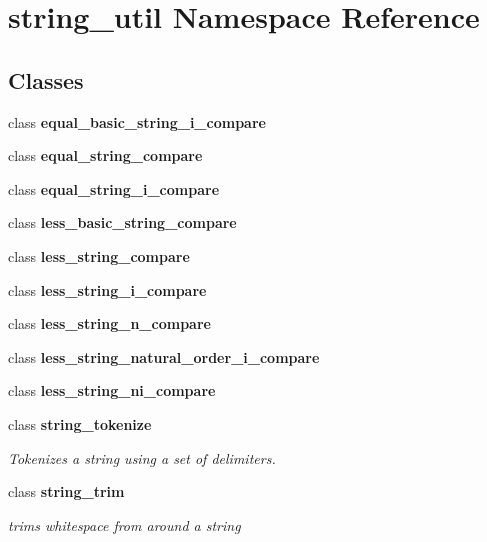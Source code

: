 \section{string\+\_\+util Namespace Reference}
\label{namespacestring__util}
\subsection*{Classes}
\begin{DoxyCompactItemize}
\item 
class {\bf equal\+\_\+basic\+\_\+string\+\_\+i\+\_\+compare}
\item 
class {\bf equal\+\_\+string\+\_\+compare}
\item 
class {\bf equal\+\_\+string\+\_\+i\+\_\+compare}
\item 
class {\bf less\+\_\+basic\+\_\+string\+\_\+compare}
\item 
class {\bf less\+\_\+string\+\_\+compare}
\item 
class {\bf less\+\_\+string\+\_\+i\+\_\+compare}
\item 
class {\bf less\+\_\+string\+\_\+n\+\_\+compare}
\item 
class {\bf less\+\_\+string\+\_\+natural\+\_\+order\+\_\+i\+\_\+compare}
\item 
class {\bf less\+\_\+string\+\_\+ni\+\_\+compare}
\item 
class {\bf string\+\_\+tokenize}
\begin{DoxyCompactList}\small\item\em Tokenizes a string using a set of delimiters. \end{DoxyCompactList}\item 
class {\bf string\+\_\+trim}
\begin{DoxyCompactList}\small\item\em trims whitespace from around a string \end{DoxyCompactList}\end{DoxyCompactItemize}
